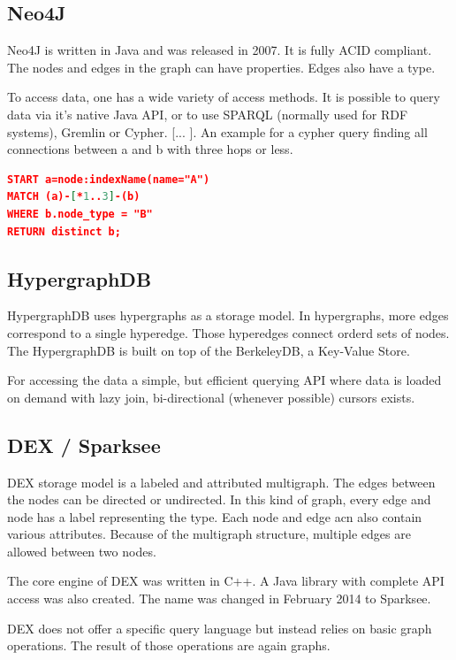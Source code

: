 \documentclass{acm_proc_article-sp}
\begin{document}
\subsection{Neo4J}

Neo4J is written in Java and was released in 2007. It is fully ACID compliant. The nodes and edges in the graph can have properties. Edges also have a type. 

To access data, one has a wide variety of access methods. It is possible to query data via it's native Java API, or to use SPARQL (normally used for RDF systems), Gremlin or Cypher. [... ]. An example for a cypher query finding all connections between a and b with three hops or less.

\begin{lstlisting}[language=json,firstnumber=1]
START a=node:indexName(name="A")
MATCH (a)-[*1..3]-(b)
WHERE b.node_type = "B"
RETURN distinct b;
\end{lstlisting}

\subsection{HypergraphDB}

HypergraphDB uses hypergraphs as a storage model. In hypergraphs, more edges correspond to a single hyperedge. Those hyperedges connect orderd sets of nodes. The HypergraphDB is built on top of the BerkeleyDB, a Key-Value Store.

For accessing the data a simple, but efficient querying
API where data is loaded on demand with lazy join, bi-directional (whenever
possible) cursors exists.

\subsection{DEX / Sparksee}

DEX storage model is a labeled and attributed multigraph. The edges between the nodes can be directed or undirected. In this kind of graph, every edge and node has a label representing the type. Each node and edge acn also contain various attributes. Because of the multigraph structure, multiple edges are allowed between two nodes.

The core engine of DEX was written in C++. A Java library with complete API access was also created. The name was changed in February 2014 to Sparksee.

DEX does not offer a specific query language but instead relies on basic graph operations. The result of those operations are again graphs.
\end{document}
